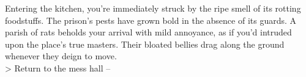 Entering the kitchen, you're immediately struck by the ripe smell of its rotting foodstuffs. The prison's pests have grown bold in the absence of its guards. A parish of rats beholds your arrival with mild annoyance, as if you'd intruded upon the place's true masters. Their bloated bellies drag along the ground whenever they deign to move.\\

> Return to the mess hall -- 